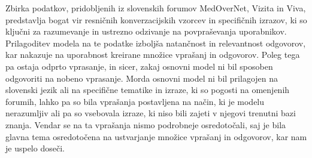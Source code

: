 \documentclass[fleqn,moreauthors,10pt]{ds_report}
\begin{document}
Zbirka podatkov, pridobljenih iz slovenskih forumov MedOverNet, Vizita in Viva, predstavlja bogat vir resničnih konverzacijskih vzorcev in specifičnih izrazov, ki so ključni za razumevanje in ustrezno odzivanje na povpraševanja uporabnikov. Prilagoditev modela na te podatke izboljša natančnost in relevantnost odgovorov, kar nakazuje na uporabnost kreirane množice vprašanj in odgovorov.
Poleg tega pa ostaja odprto vprasanje, in sicer, zakaj osnovni model ni bil sposoben odgovoriti na nobeno vprasanje. Morda osnovni model ni bil prilagojen na slovenski jezik ali na specifične tematike in izraze, ki so pogosti na omenjenih forumih, lahko pa so bila vprašanja postavljena na način, ki je modelu nerazumljiv ali pa so vsebovala izraze, ki niso bili zajeti v njegovi trenutni bazi znanja. Vendar se na ta vprašanja nismo podrobneje osredotočali, saj je bila glavna tema osredotočena na ustvarjanje množice vprašanj in odgovorov, kar nam je uspelo doseči.








\end{document}
